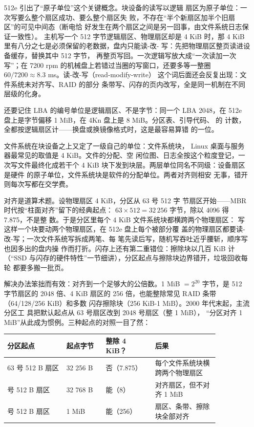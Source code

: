 512e 引出了“原子单位”这个关键概念。块设备的读写以逻辑
扇区为原子单位：一次写要么整个扇区成功、要么整个扇区失
败，不存在“半个新扇区加半个旧扇区”的可见中间态（断电恰
好发生在两个扇区之间是另一回事，由文件系统日志保证一致性）。
主机写一个 512 字节逻辑扇区、物理扇区却是 4 KiB 时，那
4 KiB 里有八分之七是必须保留的老数据，盘内只能读-改-
写：先把物理扇区整页读进设备缓存，替换其中 512 字节，
再整页写回。一次逻辑写放大成“一次读加一次写”；在
7200 rpm 的机械盘上若错过当圈的写窗口，还要多等一整圈
$60/7200\approx8.3$ ms。读-改-写（read-modify-write）
这个词后面还会反复出现：文件系统未对齐写、RAID 的部分
条带写、闪存的页内改写，全是同一机制在不同层级的化身。

还要记住 LBA 的编号单位是逻辑扇区、不是字节：同一个
LBA 2048，在 512e 盘上是字节偏移 1 MiB，在 4Kn 盘上是
8 MiB。分区表、引导代码、 的  计数，
全都按逻辑扇区计——换盘或换镜像格式时，这是最容易算错
的一位。

文件系统在块设备之上又定了一级自己的单位：文件系统块，
Linux 桌面与服务器最常见的取值是 4 KiB。文件的分配、空
闲位图、日志全按这个粒度登记，一次写文件最终化成若干个
4 KiB 块下发到块层。两层单位同名不同级：设备扇区是硬件
的原子单位，文件系统块是软件的分配单位。两者对齐则相安
无事，错开则每次写都在交学费。

对齐是道算术题。设物理扇区 4 KiB，分区从 63 号 512 字
节扇区开始——MBR 时代按“柱面对齐”留下的经典起点：
$63\times512=32\,256$ 字节，除以 4096 得 7.875，不是整
数。于是分区里每个 4 KiB 文件系统块都横跨两个物理扇区：
写这样一个块要动两个物理扇区，在 512e 盘上每个被部分覆
盖的物理扇区都要读-改-写；一次文件系统写拆成两笔、每
笔先读后写，随机写吞吐近乎腰斩，顺序写也因多出的盘内操
作而打折。闪存上还有第二重错位：擦除块以几百 KiB 计
（“SSD 与闪存的硬件特性”一节细讲），分区起点与擦除块边界错开，垃圾回收每轮
都要多搬一批页。

解决办法笨拙而有效：对齐到一个足够大的公倍数。1 MiB
$=2^{20}$ 字节，是 512 字节扇区的 2048 倍、4 KiB 扇区的
256 倍，也能整除常见 RAID 条带（64/128/256 KiB）和多数
闪存擦除块（256 KiB-1 MiB）。2000 年代末起，主流分区工
具把默认起点从 63 号扇区改到 2048 号扇区（整 1 MiB），
“分区对齐 1 MiB”从此成为惯例。三种起点的对照一目了然：

\begin{longtable}{L{0.24\linewidth}L{0.16\linewidth}L{0.2\linewidth}L{0.26\linewidth}}
\toprule
分区起点 & 起点字节 & 整除 4 KiB？ & 后果 \\
 号 512 B 扇区 & 32 256 B & 否（7.875） & 每个文件系统块横跨两个物理扇区 \\ 号 512 B 扇区 & 32 768 B & 能（8） & 对齐扇区，但不对齐 1 MiB \\ 号 512 B 扇区 & 1 MiB & 能（256） & 扇区、条带、擦除块全部对齐 \\
\bottomrule
\end{longtable}

